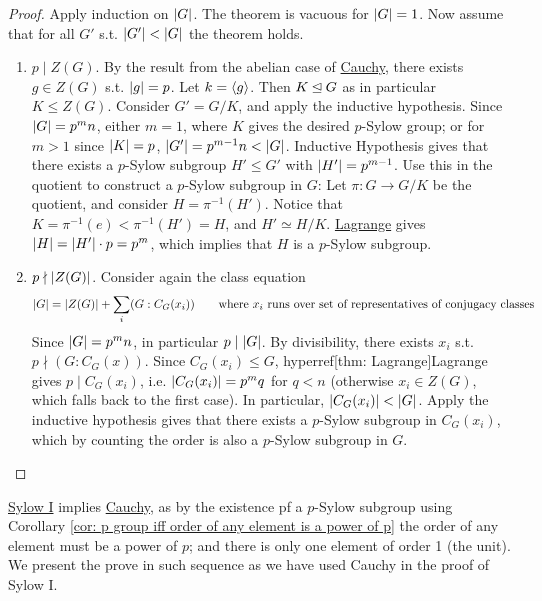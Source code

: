 \documentclass{article}
\begin{document}
\begin{proof}
    Apply induction on $\left|G\right|$. The theorem is vacuous for $\left|G\right| = 1$. Now assume that for all $G'$ s.t. $\left|G'\right| < \left|G\right|$ the theorem holds. 

    \begin{enumerate}
        \item[\bu{Case 1.}] $p \mid Z(G)$. By the result from the abelian case of \hyperref[thm: Cauchy]{Cauchy}, there exists $g \in Z(G)$ s.t. $\left|g\right| = p$. Let $k = \left\langle g \right\rangle$. Then $K \unlhd G$ as in particular $K \leq Z(G)$. Consider $G' = G/K$, and apply the inductive hypothesis. Since $\left|G\right| = p^m n$, either $m = 1$, where $K$ gives the desired $p$-Sylow group; or for $m > 1$ since $\left|K\right| = p$, $\left|G'\right| = p^{m-1}n < \left|G\right|$. Inductive Hypothesis gives that there exists a $p$-Sylow subgroup $H' \leq G'$ with $\left|H'\right| = p^{m-1}$. Use this in the quotient to construct a $p$-Sylow subgroup in $G$: Let $\pi: G \to G/K$ be the quotient, and consider $H = \pi^{-1}(H')$. Notice that $K = \pi^{-1}(e) < \pi^{-1}(H') = H$, and $H' \simeq H/K$. \hyperref[thm: Lagrange]{Lagrange} gives $\left|H\right| = \left|H'\right| \cdot p = p^m$, which implies that $H$ is a $p$-Sylow subgroup.

        \item[\bu{Case 2.}]$p \nmid \left|Z(G)\right|$. Consider again the class equation
        \[
            \left|G\right| = \left|Z(G)\right| + \sum_{i}(G : C_G(x_i)) \qquad \text{where $x_i$ runs over set of representatives of conjugacy classes}
        \]
        Since $\left|G\right| = p^m n$, in particular $p \mid \left|G\right|$. By divisibility, there exists $x_i$ s.t. $p \nmid (G: C_G(x))$. Since $C_G(x_i) \leq G$, hyperref[thm: Lagrange]{Lagrange} gives $p \mid C_G(x_i)$, i.e. $\left|C_G(x_i)\right| = p^m q$ for $q < n$ (otherwise $x_i \in Z(G)$, which falls back to the first case). In particular, $\left|C_G(x_i)\right| < \left|G\right|$. Apply the inductive hypothesis gives that there exists a $p$-Sylow subgroup in $C_G(x_i)$, which by counting the order is also a $p$-Sylow subgroup in $G$.
    \end{enumerate}
\end{proof}

\begin{remark}
    \hyperref[thm: Sylow I]{Sylow I} implies \hyperref[thm: Cauchy]{Cauchy}, as by the existence pf a $p$-Sylow subgroup using Corollary \ref{cor: p group iff order of any element is a power of p} the order of any element must be a power of $p$; and there is only one element of order 1 (the unit). We present the prove in such sequence as we have used Cauchy in the proof of Sylow I.
\end{remark}
\end{document}
